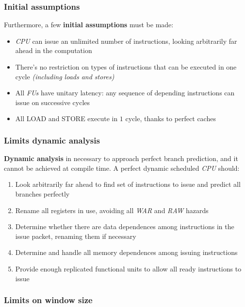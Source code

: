 \documentclass[english]{article}
\begin{document}
\subsubsection{Initial assumptions}

Furthermore, a few \textbf{initial assumptions} must be made:

\begin{itemize}
  \item \textit{CPU} can issue an unlimited number of instructions, looking arbitrarily far ahead in the computation
  \item There's no restriction on types of instructions that can be executed in one cycle \textit{(including loads and stores)}
  \item All \textit{FUs} have unitary latency: any sequence of depending instructions can issue on successive cycles
  \item All LOAD and STORE execute in \(1\) cycle, thanks to perfect caches
\end{itemize}

\subsubsection{Limits dynamic analysis}

\textbf{Dynamic analysis} in necessary to approach perfect branch prediction, and it cannot be achieved at compile time.
A perfect dynamic scheduled \textit{CPU} should:

\begin{enumerate}
  \item Look arbitrarily far ahead to find set of instructions to issue and predict all branches perfectly
  \item Rename all registers in use, avoiding all \textit{WAR} and \textit{RAW} hazards
  \item Determine whether there are data  dependences among instructions in the issue packet, renaming them if necessary
  \item Determine and handle all memory dependences among issuing instructions
  \item Provide enough replicated functional units to allow all ready instructions to issue
\end{enumerate}

\subsubsection{Limits on window size}
\end{document}
